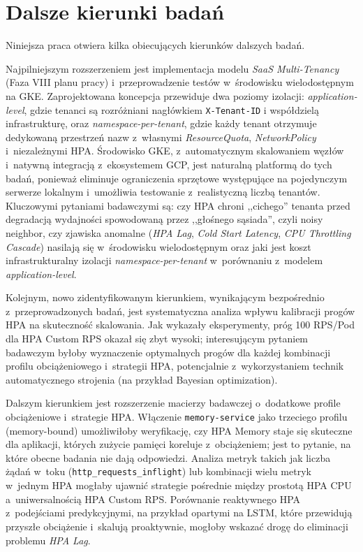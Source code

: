 \section{Dalsze kierunki badań}

Niniejsza praca otwiera kilka obiecujących kierunków dalszych badań.

Najpilniejszym rozszerzeniem jest implementacja modelu \textit{SaaS Multi-Tenancy} (Faza VIII planu pracy) i~przeprowadzenie testów w~środowisku wielodostępnym na GKE. Zaprojektowana koncepcja przewiduje dwa poziomy izolacji: \textit{application-level}, gdzie tenanci są rozróżniani nagłówkiem \texttt{X-Tenant-ID} i współdzielą infrastrukturę, oraz \textit{namespace-per-tenant}, gdzie każdy tenant otrzymuje dedykowaną przestrzeń nazw z~własnymi \textit{ResourceQuota}, \textit{NetworkPolicy} i~niezależnymi HPA. Środowisko GKE, z~automatycznym skalowaniem węzłów i~natywną integracją z~ekosystemem GCP, jest naturalną platformą do tych badań, ponieważ eliminuje ograniczenia sprzętowe występujące na pojedynczym serwerze lokalnym i~umożliwia testowanie z~realistyczną liczbą tenantów. Kluczowymi pytaniami badawczymi są: czy HPA chroni ,,cichego'' tenanta przed degradacją wydajności spowodowaną przez ,,głośnego sąsiada'', czyli noisy neighbor, czy zjawiska anomalne (\textit{HPA Lag}, \textit{Cold Start Latency}, \textit{CPU Throttling Cascade}) nasilają się w~środowisku wielodostępnym oraz jaki jest koszt infrastrukturalny izolacji \textit{namespace-per-tenant} w~porównaniu z~modelem \textit{application-level}.

Kolejnym, nowo zidentyfikowanym kierunkiem, wynikającym bezpośrednio z~przeprowadzonych badań, jest systematyczna analiza wpływu kalibracji progów HPA na skuteczność skalowania. Jak wykazały eksperymenty, próg 100 RPS/Pod dla HPA Custom RPS okazał się zbyt wysoki; interesującym pytaniem badawczym byłoby wyznaczenie optymalnych progów dla każdej kombinacji profilu obciążeniowego i~strategii HPA, potencjalnie z~wykorzystaniem technik automatycznego strojenia (na przykład Bayesian optimization).

Dalszym kierunkiem jest rozszerzenie macierzy badawczej o~dodatkowe profile obciążeniowe i~strategie HPA. Włączenie \texttt{memory-service} jako trzeciego profilu (memory-bound) umożliwiłoby weryfikację, czy HPA Memory staje się skuteczne dla aplikacji, których zużycie pamięci koreluje z~obciążeniem; jest to pytanie, na które obecne badania nie dają odpowiedzi. Analiza metryk takich jak liczba żądań w~toku (\texttt{http\_requests\_inflight}) lub kombinacji wielu metryk w~jednym HPA mogłaby ujawnić strategie pośrednie między prostotą HPA CPU a~uniwersalnością HPA Custom RPS. Porównanie reaktywnego HPA z~podejściami predykcyjnymi, na przykład opartymi na LSTM, które przewidują przyszłe obciążenie i~skalują proaktywnie, mogłoby wskazać drogę do eliminacji problemu \textit{HPA Lag}.

